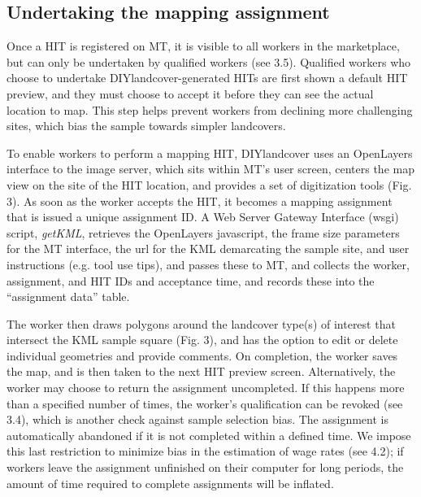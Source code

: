 \documentclass[preprint,12pt,authoryear]{elsarticle}
\begin{document}
\subsection{Undertaking the mapping assignment}
Once a HIT is registered on MT, it is visible to all workers in the marketplace, but can only be undertaken by qualified workers (see 3.5). Qualified workers who choose to undertake DIYlandcover-generated HITs are first shown a default HIT preview, and they must choose to accept it before they can see the actual location to map. This step helps prevent workers from declining more challenging sites, which bias the sample towards simpler landcovers.

To enable workers to perform a mapping HIT, DIYlandcover uses an OpenLayers interface to the image server, which sits within MT's user screen, centers the map view on the site of the HIT location, and provides a set of digitization tools  (Fig. 3). As soon as the worker accepts the HIT, it becomes a mapping assignment that is issued a unique assignment ID. A Web Server Gateway Interface (wsgi) script, \emph{getKML}, retrieves the OpenLayers javascript, the frame size parameters for the MT interface, the url for the KML demarcating the sample site, and user instructions (e.g. tool use tips), and passes these to MT, and collects the worker, assignment, and HIT IDs and acceptance time, and records these into the ``assignment data'' table. 

The worker then draws polygons around the landcover type(s) of interest that intersect the KML sample square (Fig. 3), and has the option to edit or delete individual geometries and provide comments. On completion, the worker saves the map, and is then taken to the next HIT preview screen. Alternatively, the worker may choose to return the assignment uncompleted. If this happens more than a specified number of times, the worker's qualification can be revoked (see 3.4), which is another check against sample selection bias.  The assignment is automatically abandoned if it is not completed within a defined time. We impose this last restriction to minimize bias in the estimation of wage rates (see 4.2); if workers leave the assignment unfinished on their computer for long periods, the amount of time required to complete assignments will be inflated.
\end{document}

